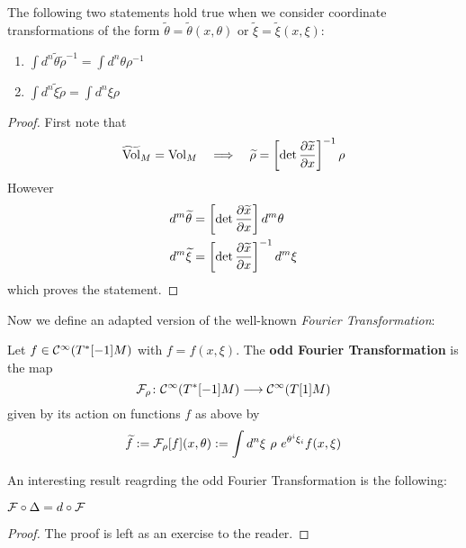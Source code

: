 \begin{lem}
  The following two statements hold true when we consider coordinate transformations of the form $\widetilde{\theta} = \widetilde{\theta}(x, \theta)$ or $\widetilde{\xi} = \widetilde{\xi}(x, \xi)$:
  \begin{enumerate}
    \item $ \int d^n \widetilde{\theta} \widetilde{\rho}^{-1} = \int d^n \theta \rho^{-1} $
    \item $ \int d^n \widetilde{\xi} \widetilde{\rho} = \int d^n \xi \rho $
  \end{enumerate}
\begin{proof}
  First note that
  \begin{equation}
    \widetilde{\operatorname{Vol}}_M = \operatorname{Vol}_M \quad \Longrightarrow \quad \widetilde{\rho} = \left[ \det \frac{\partial \widetilde{x}}{\partial x} \right]^{-1} \rho
  \end{equation}
  However
  \begin{align}
    d^m \widetilde{\theta} &= \left[ \det \frac{\partial \widetilde{x}}{\partial x} \right] d^m \theta \\
    d^m \widetilde{\xi} &= \left[ \det \frac{\partial \widetilde{x}}{\partial x} \right]^{-1} d^m \xi
  \end{align}
  which proves the statement.
\end{proof}
\end{lem}

Now we define an adapted version of the well-known \emph{Fourier Transformation}:

\begin{definition}
  Let $f \in \mathcal{C}^{\infty}(T^*[-1]M)$ with $f = f(x, \xi)$. The \textbf{odd Fourier Transformation} is the map
  \begin{equation}
    {\mathcal{F}}_\rho \colon \mathcal{C}^{\infty}(T^*[-1]M) \longrightarrow \mathcal{C}^{\infty}(T[1]M)
  \end{equation}
  given by its action on functions $f$ as above by
  \begin{equation}
    \widetilde{f} := {\mathcal{F}}_\rho [f](x, \theta) := \int d^n \xi \ \rho \ e^{\theta^i \xi_i} f(x, \xi)
  \end{equation}
\end{definition}

An interesting result reagrding the odd Fourier Transformation is the following:

\begin{prop}
  ${\mathcal{F}} \circ \Delta = d \circ {\mathcal{F}}$
\begin{proof}
  The proof is left as an exercise to the reader.
\end{proof}
\end{prop}

